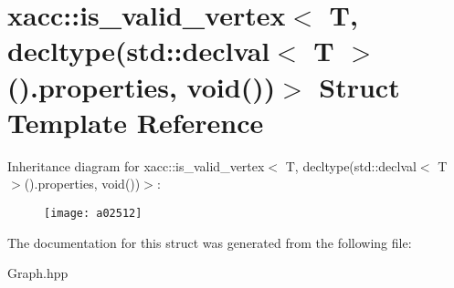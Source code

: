 \hypertarget{a02512}{}\section{xacc\+:\+:is\+\_\+valid\+\_\+vertex$<$ T, decltype(std\+:\+:declval$<$ T $>$().properties, void())$>$ Struct Template Reference}
\label{a02512}
Inheritance diagram for xacc\+:\+:is\+\_\+valid\+\_\+vertex$<$ T, decltype(std\+:\+:declval$<$ T $>$().properties, void())$>$\+:\begin{figure}[H]
\begin{center}
\leavevmode
\texttt{[image: a02512]}
\end{center}
\end{figure}


The documentation for this struct was generated from the following file\+:\begin{DoxyCompactItemize}
\item 
Graph.\+hpp\end{DoxyCompactItemize}
